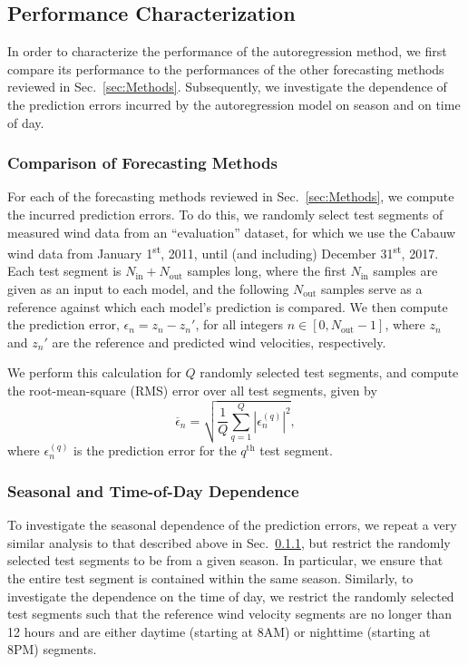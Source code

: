 \documentclass[11pt, oneside]{article}
\newcommand{\secref}[1]{Sec.~\ref{#1}}
\begin{document}
\subsection{Performance Characterization}
In order to characterize the performance of the autoregression method, we first compare its performance to the performances of the other forecasting methods reviewed in \secref{sec:Methods}.
Subsequently, we investigate the dependence of the prediction errors incurred by the autoregression model on season and on time of day.

\subsubsection{Comparison of Forecasting Methods}\label{sec:Methodology:Comparison}
For each of the forecasting methods reviewed in \secref{sec:Methods}, we compute the incurred prediction errors.
To do this, we randomly select test segments of measured wind data from an ``evaluation'' dataset, for which we use the Cabauw wind data from January 1\textsuperscript{st}, 2011, until (and including) December 31\textsuperscript{st}, 2017.
Each test segment is $N_\text{in} + N_\text{out}$ samples long, where the first $N_\text{in}$ samples are given as an input to each model, and the following $N_\text{out}$ samples serve as a reference against which each model's prediction is compared.
We then compute the prediction error, $\epsilon_n = z_n - z_n'$, for all integers $n \in [0,N_\text{out}-1]$, where $z_n$ and $z_n'$ are the reference and predicted wind velocities, respectively.

We perform this calculation for $Q$ randomly selected test segments, and compute the root-mean-square (RMS) error over all test segments, given by
\begin{equation}\label{eq:RMSError}
\overline{\epsilon}_n = \sqrt{ \frac{1}{Q} \sum_{q = 1}^Q \left| \epsilon_n^{(q)} \right|^2 },
\end{equation}
where $\epsilon_n^{(q)}$ is the prediction error for the $q^\text{th}$ test segment.

\subsubsection{Seasonal and Time-of-Day Dependence}\label{sec:Methodology:SeasonalAndDiurnalDependence}
To investigate the seasonal dependence of the prediction errors, we repeat a very similar analysis to that described above in \secref{sec:Methodology:Comparison}, but restrict the randomly selected test segments to be from a given season.
In particular, we ensure that the entire test segment is contained within the same season.
Similarly, to investigate the dependence on the time of day, we restrict the randomly selected test segments such that the reference wind velocity segments are no longer than 12 hours and are either daytime (starting at 8AM) or nighttime (starting at 8PM) segments.
\end{document}
